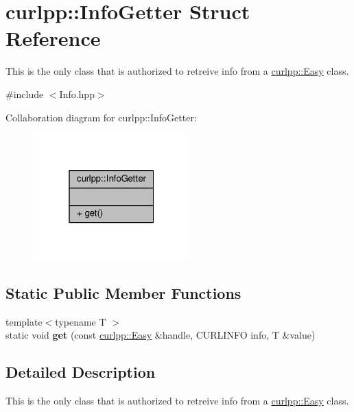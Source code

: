 \hypertarget{structcurlpp_1_1InfoGetter}{\section{curlpp\-:\-:Info\-Getter Struct Reference}
\label{structcurlpp_1_1InfoGetter}
}


This is the only class that is authorized to retreive info from a \hyperlink{classcurlpp_1_1Easy}{curlpp\-::\-Easy} class.  




{\ttfamily \#include $<$Info.\-hpp$>$}



Collaboration diagram for curlpp\-:\-:Info\-Getter\-:
\nopagebreak
\begin{figure}[H]
\begin{center}
\leavevmode
\includegraphics[width=172pt]{structcurlpp_1_1InfoGetter__coll__graph}
\end{center}
\end{figure}
\subsection*{Static Public Member Functions}
\begin{DoxyCompactItemize}
\item 
\hypertarget{structcurlpp_1_1InfoGetter_af0ccdea821e69fcd8b989225a2fdc53e}{{\footnotesize template$<$typename T $>$ }\\static void {\bfseries get} (const \hyperlink{classcurlpp_1_1Easy}{curlpp\-::\-Easy} \&handle, C\-U\-R\-L\-I\-N\-F\-O info, T \&value)}\label{structcurlpp_1_1InfoGetter_af0ccdea821e69fcd8b989225a2fdc53e}

\end{DoxyCompactItemize}


\subsection{Detailed Description}
This is the only class that is authorized to retreive info from a \hyperlink{classcurlpp_1_1Easy}{curlpp\-::\-Easy} class. 

